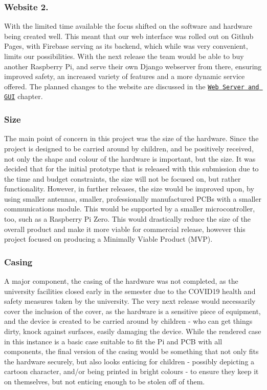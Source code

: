 \subsubsection*{Website 2.}

With the limited time available the focus shifted on the software and hardware being created well. This meant that our web interface was rolled out on Github Pages, with Firebase serving as its backend, which while was very convenient, limits our possibilities. With the next release the team would be able to buy another Raspberry Pi, and serve their own Django webserver from there, ensuring improved safety, an increased variety of features and a more dynamic service offered. The planned changes to the website are discussed in the \href{https://github.com/itsBelinda/ENG5220-2020-Team13/wiki/Server-and-Web-App#release-v20}{\tt Web Server and G\+UI} chapter.

\subsubsection*{Size}

The main point of concern in this project was the size of the hardware. Since the project is designed to be carried around by children, and be positively received, not only the shape and colour of the hardware is important, but the size. It was decided that for the initial prototype that is released with this submission due to the time and budget constraints, the size will not be focused on, but rather functionality. However, in further releases, the size would be improved upon, by using smaller antennas, smaller, professionally manufactured P\+C\+Bs with a smaller communications module. This would be supported by a smaller microcontroller, too, such as a Raspberry Pi Zero. This would drastically reduce the size of the overall product and make it more viable for commercial release, however this project focused on producing a Minimally Viable Product (M\+VP).

\subsubsection*{Casing}

A major component, the casing of the hardware was not completed, as the university facilities closed early in the semester due to the C\+O\+V\+I\+D19 health and safety measures taken by the university. The very next release would necessarily cover the inclusion of the cover, as the hardware is a sensitive piece of equipment, and the device is created to be carried around by children -\/ who can get things dirty, knock against surfaces, easily damaging the device. While the rendered case in this instance is a basic case suitable to fit the Pi and P\+CB with all components, the final version of the casing would be something that not only fits the hardware securely, but also looks enticing for children -\/ possibly depicting a cartoon character, and/or being printed in bright colours -\/ to ensure they keep it on themselves, but not enticing enough to be stolen off of them.

